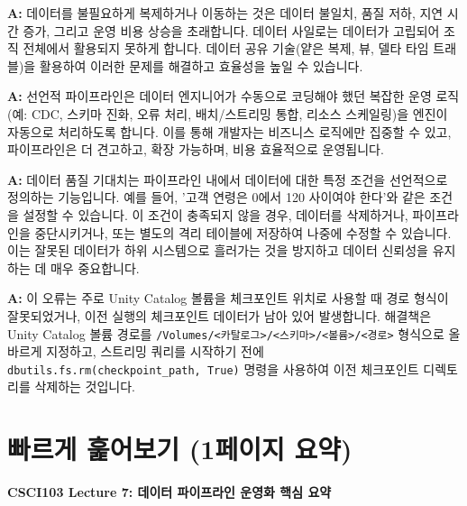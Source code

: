 \documentclass[11pt,a4paper]{article}
\theoremstyle{definition}
\newcommand{\newsection}[1]{\newpage\section{#1}}
\begin{document}
\begin{enumerate}
\begin{tcolorbox}[conceptbox, title={Q: 데이터 사일로를 제거하고 데이터 이동을 최소화해야 하는 이유는 무엇인가요?}]
\textbf{A:} 데이터를 불필요하게 복제하거나 이동하는 것은 데이터 불일치, 품질 저하, 지연 시간 증가, 그리고 운영 비용 상승을 초래합니다. 데이터 사일로는 데이터가 고립되어 조직 전체에서 활용되지 못하게 합니다. 데이터 공유 기술(얕은 복제, 뷰, 델타 타임 트래블)을 활용하여 이러한 문제를 해결하고 효율성을 높일 수 있습니다.
\end{tcolorbox}

\begin{tcolorbox}[conceptbox, title={Q: LakeFlow 선언적 파이프라인이 기존 스트리밍 코드보다 어떤 이점이 있나요?}]
\textbf{A:} 선언적 파이프라인은 데이터 엔지니어가 수동으로 코딩해야 했던 복잡한 운영 로직(예: CDC, 스키마 진화, 오류 처리, 배치/스트리밍 통합, 리소스 스케일링)을 엔진이 자동으로 처리하도록 합니다. 이를 통해 개발자는 비즈니스 로직에만 집중할 수 있고, 파이프라인은 더 견고하고, 확장 가능하며, 비용 효율적으로 운영됩니다.
\end{tcolorbox}

\begin{tcolorbox}[conceptbox, title={Q: 데이터 품질 기대치(Expectations)는 어떻게 작동하며, 왜 중요한가요?}]
\textbf{A:} 데이터 품질 기대치는 파이프라인 내에서 데이터에 대한 특정 조건을 선언적으로 정의하는 기능입니다. 예를 들어, '고객 연령은 0에서 120 사이여야 한다'와 같은 조건을 설정할 수 있습니다. 이 조건이 충족되지 않을 경우, 데이터를 삭제하거나, 파이프라인을 중단시키거나, 또는 별도의 격리 테이블에 저장하여 나중에 수정할 수 있습니다. 이는 잘못된 데이터가 하위 시스템으로 흘러가는 것을 방지하고 데이터 신뢰성을 유지하는 데 매우 중요합니다.
\end{tcolorbox}

\begin{tcolorbox}[conceptbox, title={Q: 과제에서 체크포인트 위치 오류가 발생했는데, 어떻게 해결해야 하나요?}]
\textbf{A:} 이 오류는 주로 Unity Catalog 볼륨을 체크포인트 위치로 사용할 때 경로 형식이 잘못되었거나, 이전 실행의 체크포인트 데이터가 남아 있어 발생합니다. 해결책은 Unity Catalog 볼륨 경로를 \texttt{/Volumes/<카탈로그>/<스키마>/<볼륨>/<경로>} 형식으로 올바르게 지정하고, 스트리밍 쿼리를 시작하기 전에 \texttt{dbutils.fs.rm(checkpoint_path, True)} 명령을 사용하여 이전 체크포인트 디렉토리를 삭제하는 것입니다.
\end{tcolorbox}

\newsection{빠르게 훑어보기 (1페이지 요약)}

\begin{tcolorbox}[summarybox]
\textbf{CSCI103 Lecture 7: 데이터 파이프라인 운영화 핵심 요약}


\end{tcolorbox}
\end{enumerate}
\end{document}
